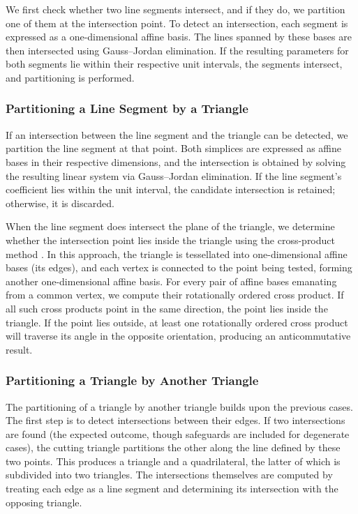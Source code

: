 We first check whether two line segments intersect, and if they do, 
we partition one of them at the intersection point. To detect an 
intersection, each segment is expressed as a one-dimensional affine 
basis. The lines spanned by these bases are then intersected using 
Gauss--Jordan elimination. If the resulting parameters for both 
segments lie within their respective unit intervals, the segments 
intersect, and partitioning is performed.

\subsubsection{Partitioning a Line Segment by a Triangle}

If an intersection between the line segment and the triangle can be 
detected, we partition the line segment at that point. Both simplices 
are expressed as affine bases in their respective dimensions, and the 
intersection is obtained by solving the resulting linear system via 
Gauss--Jordan elimination. If the line segment's coefficient lies 
within the unit interval, the candidate intersection is retained; 
otherwise, it is discarded. 

When the line segment does intersect the plane of the triangle, we 
determine whether the intersection point lies inside the triangle 
using the cross-product method \cite{51328}. In this approach, the 
triangle is tessellated into one-dimensional affine bases (its edges), 
and each vertex is connected to the point being tested, forming 
another one-dimensional affine basis. For every pair of affine bases 
emanating from a common vertex, we compute their rotationally ordered 
cross product. If all such cross products point in the same direction, 
the point lies inside the triangle. If the point lies outside, at 
least one rotationally ordered cross product will traverse its angle 
in the opposite orientation, producing an anticommutative result.

\subsubsection{Partitioning a Triangle by Another Triangle}

The partitioning of a triangle by another triangle builds upon the 
previous cases. The first step is to detect intersections between 
their edges. If two intersections are found (the expected outcome, 
though safeguards are included for degenerate cases), the cutting 
triangle partitions the other along the line defined by these two 
points. This produces a triangle and a quadrilateral, the latter of 
which is subdivided into two triangles. The intersections themselves 
are computed by treating each edge as a line segment and determining 
its intersection with the opposing triangle.

